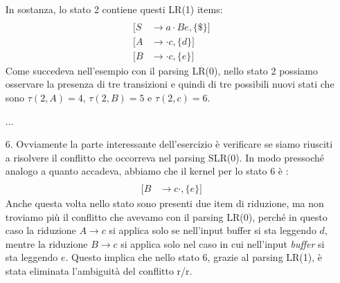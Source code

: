 \documentclass[class=book, crop=false, oneside, 12pt]{standalone}
\begin{document}
\begin{enumerate}
    In sostanza, lo stato 2 contiene questi LR(1) items:
    \begin{align*}
        [S &\to a \cdot Ad, \{\$\}] \\
        [S &\to a \cdot Be, \{\$\}] \\
        [A &\to \cdot c, \{d\}] \\
        [B &\to \cdot c, \{e\}]
    \end{align*}
    Come succedeva nell'esempio con il parsing LR(0), nello stato 2 possiamo osservare la presenza di tre transizioni e quindi di tre possibili nuovi stati che sono \(\tau(2,A)=4 \textrm{, } \tau(2,B)=5 \textrm{ e } \tau(2,c)=6\).
    \item[...]
    \item[6.] Ovviamente la parte interessante dell'esercizio è verificare se siamo riusciti a risolvere il conflitto che occorreva nel parsing SLR(0). In modo pressoché analogo a quanto accadeva, abbiamo che il kernel per lo stato 6 è :
    \begin{align*}
        [A &\to c \cdot, \{d\}] \\
        [B &\to c \cdot, \{e\}]
    \end{align*}
    Anche questa volta nello stato sono presenti due item di riduzione, ma non troviamo più il conflitto che avevamo con il parsing LR(0), perché in questo caso la riduzione \(A \to c\) si applica solo se nell'input buffer si sta leggendo \(d\), mentre la riduzione \(B \to c\) si applica solo nel caso in cui nell'input \emph{buffer} si sta leggendo \(e\). Questo implica che nello stato 6, grazie al parsing LR(1), è stata eliminata l'ambiguità del conflitto r/r.
\end{enumerate}
\end{document}
